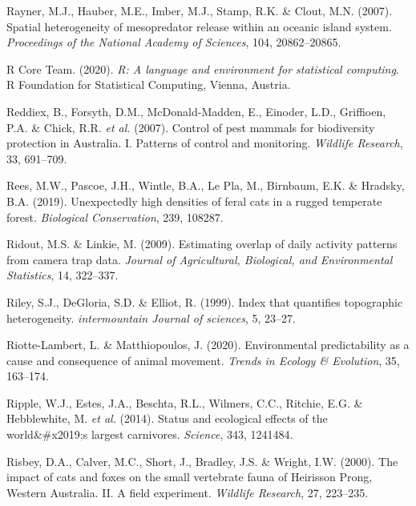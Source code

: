 \documentclass[11pt,a4paper,titlepage,twoside,openright]{style/unimelbthesis}
\begin{document}
\begin{mainmatter}
\leavevmode\hypertarget{ref-rayner2007spatial}{}%
Rayner, M.J., Hauber, M.E., Imber, M.J., Stamp, R.K. \& Clout, M.N. (2007). Spatial heterogeneity of mesopredator release within an oceanic island system. \emph{Proceedings of the National Academy of Sciences}, 104, 20862--20865.

\leavevmode\hypertarget{ref-R}{}%
R Core Team. (2020). \emph{R: A language and environment for statistical computing}. R Foundation for Statistical Computing, Vienna, Austria.

\leavevmode\hypertarget{ref-reddiex2007control}{}%
Reddiex, B., Forsyth, D.M., McDonald-Madden, E., Einoder, L.D., Griffioen, P.A. \& Chick, R.R. \emph{et al.} (2007). Control of pest mammals for biodiversity protection in Australia. I. Patterns of control and monitoring. \emph{Wildlife Research}, 33, 691--709.

\leavevmode\hypertarget{ref-rees2019unexpectedly}{}%
Rees, M.W., Pascoe, J.H., Wintle, B.A., Le Pla, M., Birnbaum, E.K. \& Hradsky, B.A. (2019). Unexpectedly high densities of feral cats in a rugged temperate forest. \emph{Biological Conservation}, 239, 108287.

\leavevmode\hypertarget{ref-ridout2009estimating}{}%
Ridout, M.S. \& Linkie, M. (2009). Estimating overlap of daily activity patterns from camera trap data. \emph{Journal of Agricultural, Biological, and Environmental Statistics}, 14, 322--337.

\leavevmode\hypertarget{ref-riley1999index}{}%
Riley, S.J., DeGloria, S.D. \& Elliot, R. (1999). Index that quantifies topographic heterogeneity. \emph{intermountain Journal of sciences}, 5, 23--27.

\leavevmode\hypertarget{ref-riotte-lambert2020environmental}{}%
Riotte-Lambert, L. \& Matthiopoulos, J. (2020). Environmental predictability as a cause and consequence of animal movement. \emph{Trends in Ecology \& Evolution}, 35, 163--174.

\leavevmode\hypertarget{ref-ripple2014status}{}%
Ripple, W.J., Estes, J.A., Beschta, R.L., Wilmers, C.C., Ritchie, E.G. \& Hebblewhite, M. \emph{et al.} (2014). Status and ecological effects of the world\&\#x2019;s largest carnivores. \emph{Science}, 343, 1241484.

\leavevmode\hypertarget{ref-risbey2000impacts}{}%
Risbey, D.A., Calver, M.C., Short, J., Bradley, J.S. \& Wright, I.W. (2000). The impact of cats and foxes on the small vertebrate fauna of Heirisson Prong, Western Australia. II. A field experiment. \emph{Wildlife Research}, 27, 223--235.


\end{mainmatter}
\end{document}
